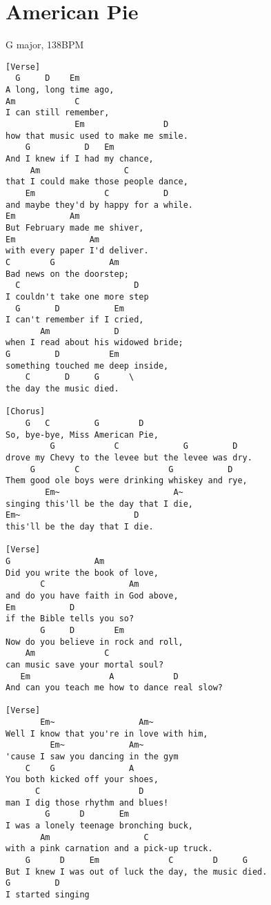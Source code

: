 \documentclass[../../songbookMain]{subfiles}
\begin{document}
\section{American Pie}
{\tiny
G major, 138BPM
}


\begin{verbatim}
[Verse]
  G     D    Em
A long, long time ago,
Am            C
I can still remember,
              Em                D
how that music used to make me smile.
    G           D   Em
And I knew if I had my chance,
     Am                 C
that I could make those people dance,
    Em              C           D
and maybe they'd by happy for a while.
Em           Am
But February made me shiver,
Em               Am
with every paper I'd deliver.
C        G           Am
Bad news on the doorstep;
  C                       D
I couldn't take one more step
  G       D           Em
I can't remember if I cried,
       Am             D
when I read about his widowed bride;
G         D          Em
something touched me deep inside,
    C       D     G      \
the day the music died.
 
[Chorus]
    G   C         G        D
So, bye-bye, Miss American Pie,
         G            C             G         D
drove my Chevy to the levee but the levee was dry.
     G        C                  G           D
Them good ole boys were drinking whiskey and rye,
        Em~                       A~
singing this'll be the day that I die,
Em~                       D
this'll be the day that I die.
 
[Verse]
G                 Am
Did you write the book of love,
       C                 Am
and do you have faith in God above,
Em           D
if the Bible tells you so?
       G     D        Em
Now do you believe in rock and roll,
    Am              C
can music save your mortal soul?
   Em                A            D
And can you teach me how to dance real slow?
 
[Verse]
       Em~                 Am~
Well I know that you're in love with him,
         Em~             Am~
'cause I saw you dancing in the gym
    C    G               A
You both kicked off your shoes,
      C                    D
man I dig those rhythm and blues!
        G      D       Em
I was a lonely teenage bronching buck,
       Am                   C
with a pink carnation and a pick-up truck.
    G      D     Em              C        D     G
But I knew I was out of luck the day, the music died.
G         D
I started singing
 

\end{verbatim}
\end{document}
